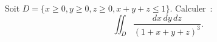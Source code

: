 \begin{exercice}\label{exoIntegralesMultiples0005}

Soit $D=\{x\geq 0, y\geq 0, z\geq 0, x+y+z\leq 1\}$. Calculer~: 
\begin{equation}
\iint_D \frac{dx\, dy\, dz}{(1+x+y+z)^3}.
\end{equation}

\end{exercice}
